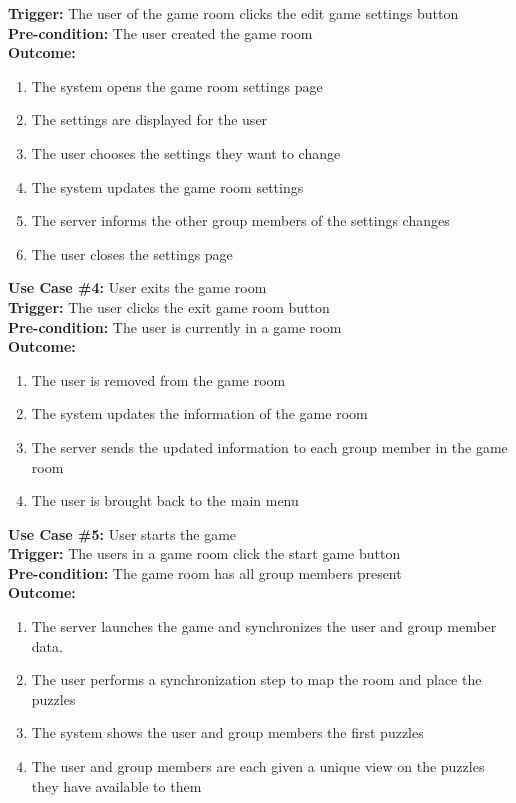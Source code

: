\documentclass[12pt]{article}
\begin{document}
\textbf{Trigger:} The user of the game room clicks the edit game settings button\\
\textbf{Pre-condition:} The user created the game room\\
\textbf{Outcome:}
\begin{enumerate}
	\item The system opens the game room settings page
    \item The settings are displayed for the user
    \item The user chooses the settings they want to change
    \item The system updates the game room settings
    \item The server informs the other group members of the settings changes
    \item The user closes the settings page
\end{enumerate}
\textbf{Use Case \#4:} User exits the game room\\
\textbf{Trigger:} The user clicks the exit game room button\\
\textbf{Pre-condition:} The user is currently in a game room\\
\textbf{Outcome:}
\begin{enumerate}
	\item The user is removed from the game room
    \item The system updates the information of the game room
    \item The server sends the updated information to each group member in the game room
    \item The user is brought back to the main menu
\end{enumerate}
\textbf{Use Case \#5:} User starts the game\\
\textbf{Trigger:} The users in a game room click the start game button\\
\textbf{Pre-condition:} The game room has all group members present\\
\textbf{Outcome:}
\begin{enumerate}
	\item The server launches the game and synchronizes the user and group member data. 
    \item The user performs a synchronization step to map the room and place the puzzles
    \item The system shows the user and group members the first puzzles
    \item The user and group members are each given a unique view on the puzzles they have available to them
\end{enumerate}
\end{document}
